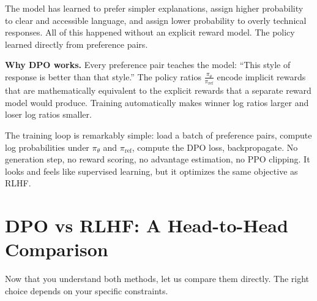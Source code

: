 \begin{chapterenv}
The model has learned to prefer simpler explanations, assign higher probability to clear and accessible language, and assign lower probability to overly technical responses. All of this happened without an explicit reward model. The policy learned directly from preference pairs.

\begin{infobox}
\textbf{Why DPO works.} Every preference pair teaches the model: ``This style of response is better than that style.'' The policy ratios $\frac{\pi_\theta}{\pi_{\text{ref}}}$ encode implicit rewards that are mathematically equivalent to the explicit rewards that a separate reward model would produce. Training automatically makes winner log ratios larger and loser log ratios smaller.

The training loop is remarkably simple: load a batch of preference pairs, compute log probabilities under $\pi_\theta$ and $\pi_{\text{ref}}$, compute the DPO loss, backpropagate. No generation step, no reward scoring, no advantage estimation, no PPO clipping. It looks and feels like supervised learning, but it optimizes the same objective as RLHF.
\end{infobox}

\section{DPO vs RLHF: A Head-to-Head Comparison}

Now that you understand both methods, let us compare them directly. The right choice depends on your specific constraints.


\end{chapterenv}

